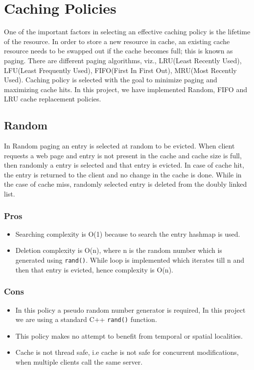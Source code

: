 \documentclass[11pt,pdftex,twocolumn]{article}
\begin{document}
\section{Caching Policies}
\label{sec:cachePol}
One of the important factors in selecting an effective caching policy is the lifetime of the resource. In order to store a new resource in cache, an existing cache resource needs to be swapped out if the cache becomes full; this is known as paging. There are different paging algorithms, viz., LRU(Least Recently Used), LFU(Least Frequently Used), FIFO(First In First Out), MRU(Most Recently Used). Caching policy is selected with the goal to minimize paging and maximizing cache hits. In this project, we have implemented Random, FIFO and LRU cache replacement policies.
\subsection{Random}
In Random paging an entry is selected at random to be evicted. When client requests a web page and entry is not present in the cache and cache size is full, then randomly a entry is selected and that entry is evicted. In case of cache hit, the entry is returned to the client and no change in the cache is done. While in the case of cache miss, randomly selected entry is deleted from the doubly linked list.
\subsubsection{Pros}
\begin{itemize}
	\item Searching complexity is O(1) because to search the entry hashmap is used.
	\item Deletion complexity is O(n), where n is the random number which is generated using \texttt{rand()}. While loop is implemented which iterates till n and then that entry is evicted, hence complexity is O(n).
\end{itemize}
\subsubsection{Cons}
\begin{itemize}
	\item In this policy a pseudo random number generator is required, In this project we are using a standard C++ \texttt{rand()} function.
	\item This policy makes no attempt to benefit from temporal or spatial localities. 
	\item Cache is not thread safe, i.e cache is not safe for concurrent modifications, when multiple clients call the same server.
\end{itemize}
\end{document}
